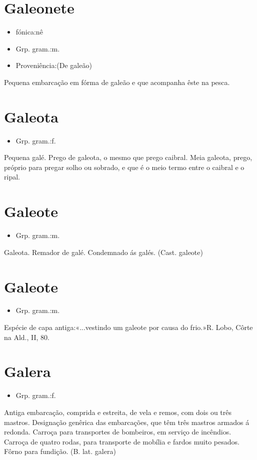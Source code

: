 \section{Galeonete}
\begin{itemize}
\item {fónica:nê}
\end{itemize}
\begin{itemize}
\item {Grp. gram.:m.}
\end{itemize}
\begin{itemize}
\item {Proveniência:(De \textunderscore galeão\textunderscore )}
\end{itemize}
Pequena embarcação em fórma de galeão e que acompanha êste na pesca.
\section{Galeota}
\begin{itemize}
\item {Grp. gram.:f.}
\end{itemize}
Pequena galé.
\textunderscore Prego de galeota\textunderscore , o mesmo que \textunderscore prego caibral\textunderscore .
\textunderscore Meia galeota\textunderscore , prego, próprio para pregar solho ou sobrado, e que é o meio termo entre o caibral e o ripal.
\section{Galeote}
\begin{itemize}
\item {Grp. gram.:m.}
\end{itemize}
Galeota.
Remador de galé.
Condemnado ás galés.
(Cast. \textunderscore galeote\textunderscore )
\section{Galeote}
\begin{itemize}
\item {Grp. gram.:m.}
\end{itemize}
Espécie de capa antiga:«\textunderscore ...vestindo um galeote por causa do frio.\textunderscore »R. Lobo, \textunderscore Côrte na Ald.\textunderscore , II, 80.
\section{Galera}
\begin{itemize}
\item {Grp. gram.:f.}
\end{itemize}
Antiga embarcação, comprida e estreita, de vela e remos, com dois ou três mastros.
Designação genêrica das embarcações, que têm três mastros armados á redonda.
Carroça para transportes de bombeiros, em serviço de incêndios.
Carroça de quatro rodas, para transporte de mobília e fardos muito pesados.
Fôrno para fundição.
(B. lat. \textunderscore galera\textunderscore )
